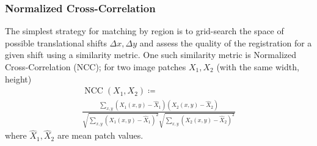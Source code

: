 \subsubsection{Normalized Cross-Correlation}
The simplest strategy for matching by region is to grid-search the space of possible translational shifts \(\Delta x, \Delta y\) and assess the quality of the registration for a given shift using a similarity metric.
%
One such similarity metric is Normalized Cross-Correlation (NCC); for two image patches \(X_1, X_2\) (with the same width, height)
\begin{multline}
	\operatorname{NCC}(X_1, X_2) \coloneqq \\ \frac{\sum_{x,y} \left(X_1(x,y) - \hat{X}_1\right) \left(X_2(x,y) - \hat{X}_2\right)}{\sqrt{\sum_{x,y} \left(X_1(x,y) - \hat{X}_1\right)^2} \sqrt{ \sum_{x,y} \left(X_2(x,y) - \hat{X}_2\right)^2 }}
\end{multline}
where \(\hat{X}_1, \hat{X}_2\) are mean patch values.

